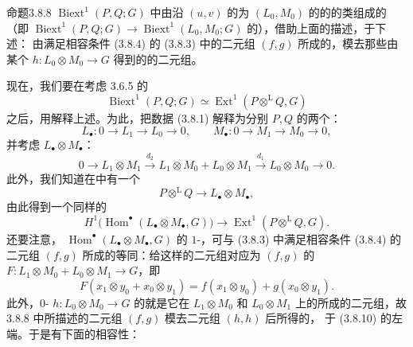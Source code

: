 \begin{SGAresult}{命题}{3.8.8}
$\operatorname{Biext}^1(P,Q;G)$ 中由沿 $(u,v)$ 的为 $(L_0,M_0)$ 的的的类组成的（即 $\operatorname{Biext}^1(P,Q;G)\to\operatorname{Biext}^1(L_0,M_0;G)$ 的），借助上面的描述，于下述：
由满足相容条件 (3.8.4) 的 (3.8.3) 中的二元组 $(f,g)$ 所成的，模去那些由某个 $h:L_0\otimes M_0\to G$ 得到的的二元组。
\end{SGAresult}

现在，我们要在考虑 3.6.5 的
\[
\operatorname{Biext}^1(P,Q;G)\simeq\operatorname{Ext}^1(P\mathbin{\otimes^{\mathrm L}}Q,G)
\]
之后，用解释上述。为此，把数据 (3.8.1) 解释为分别 $P,Q$ 的两个：
\[
L_\bullet:0\longrightarrow L_1\longrightarrow L_0\longrightarrow0,
\qquad M_\bullet:0\longrightarrow M_1\longrightarrow M_0\longrightarrow0,\tag{3.8.9}
\]
并考虑 $L_\bullet\otimes M_\bullet$：
\[
0\longrightarrow L_1\otimes M_1\xrightarrow{d_2}
L_1\otimes M_0+L_0\otimes M_1\xrightarrow{d_1}L_0\otimes M_0\longrightarrow0.
\]
此外，我们知道在中有一个
\[
P\mathbin{\otimes^{\mathrm L}}Q\longrightarrow L_\bullet\otimes M_\bullet,
\]
由此得到一个同样的
\[
H^1\bigl(\operatorname{Hom}^\bullet(L_\bullet\otimes M_\bullet,G)\bigr)
\longrightarrow\operatorname{Ext}^1(P\mathbin{\otimes^{\mathrm L}}Q,G).\tag{3.8.10}
\]
还要注意， $\operatorname{Hom}^\bullet(L_\bullet\otimes M_\bullet,G)$ 的 $1$-，可与 (3.8.3) 中满足相容条件 (3.8.4) 的二元组 $(f,g)$ 所成的等同：给这样的二元组对应为 $(f,g)$ 的 $F:L_1\otimes M_0+L_0\otimes M_1\to G$，即
\[
F(x_1\otimes y_0+x_0\otimes y_1)=f(x_1\otimes y_0)+g(x_0\otimes y_1).\tag{3.8.11}
\]
此外，$0$- $h:L_0\otimes M_0\to G$ 的就是它在 $L_1\otimes M_0$ 和 $L_0\otimes M_1$ 上的所成的二元组，故 3.8.8 中所描述的二元组 $(f,g)$ 模去二元组 $(h,h)$ 后所得的，
于 (3.8.10) 的左端。于是有下面的相容性：

